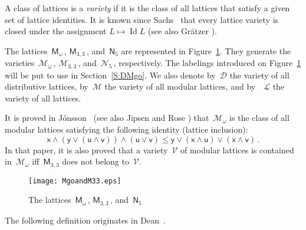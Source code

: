 \documentclass[reqno]{amsart}
\numberwithin{equation}{section}
\theoremstyle{plain}
\theoremstyle{definition}
\theoremstyle{remark}
\numberwithin{figure}{section}
\numberwithin{table}{section}
\begin{document}
A class of lattices is a \emph{variety} if it is the class of all lattices that satisfy a given set of lattice identities.
It is known since Sachs~\cite{Sachs61} that every lattice variety is closed under the assignment $L\mapsto\operatorname{Id} L$ (see also Gr\"atzer \cite[Lemma~59]{LTF}).

The lattices~${{\mathsf{M}}}_{\omega}$\,, ${{\mathsf{M}}}_{3,3}$\,, and~${{\mathsf{N}}}_5$ are represented in Figure~\ref{Fig:MgoandM33}.
They generate the varieties~${\mathcal{M}}_{\omega}$\,, ${\mathcal{M}}_{3,3}$\,, and~${\mathcal{N}}_5$\,, respectively.
The labelings introduced on Figure~\ref{Fig:MgoandM33} will be put to use in Section~\ref{S:DMgo}.
We also denote by~${\mathcal{D}}$ the variety of all distributive lattices, by~${\mathcal{M}}$ the variety of all modular lattices, and by~ ${\mathcal{L}}$ the variety of all lattices.

It is proved in J\'onsson~\cite{Jons68} (see also Jipsen and Rose \cite[\S~3.2]{JiRo92}) that~${\mathcal{M}}_{\omega}$ is the class of all modular lattices satisfying the following identity (lattice inclusion):
 \[
 {\mathsf{x}}\wedge({\mathsf{y}}\vee({\mathsf{u}}\wedge{\mathsf{v}}))\wedge({\mathsf{u}}\vee{\mathsf{v}})\leq
 {\mathsf{y}}\vee({\mathsf{x}}\wedge{\mathsf{u}})\vee({\mathsf{x}}\wedge{\mathsf{v}})\,.
 \]
In that paper, it is also proved that a variety~${\mathcal{V}}$ of modular lattices is contained in~${\mathcal{M}}_{\omega}$ if{f}~${{\mathsf{M}}}_{3,3}$ does not belong to~${\mathcal{V}}$.

\begin{figure}[htb]
\texttt{[image: MgoandM33.eps]}
\caption{The lattices~${{\mathsf{M}}}_{\omega}$\,, ${{\mathsf{M}}}_{3,3}$\,, and~${{\mathsf{N}}}_5$}
\label{Fig:MgoandM33}
\end{figure}

The following definition originates in Dean~\cite{Dean64}.
\end{document}
